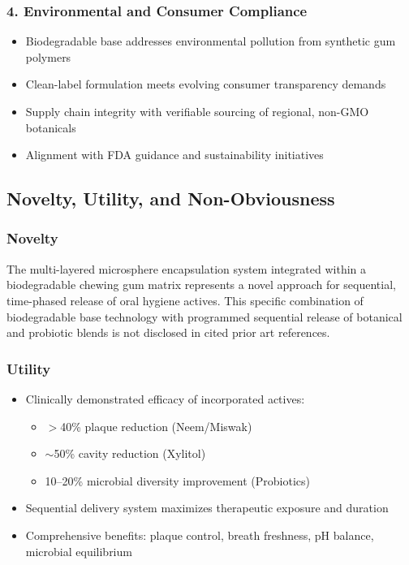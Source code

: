 \documentclass[12pt]{article}
\begin{document}
\subsubsection*{4. Environmental and Consumer Compliance}
\begin{itemize}
    \item Biodegradable base addresses environmental pollution from synthetic gum polymers
    \item Clean-label formulation meets evolving consumer transparency demands
    \item Supply chain integrity with verifiable sourcing of regional, non-GMO botanicals
    \item Alignment with FDA guidance and sustainability initiatives
\end{itemize}

\subsection*{Novelty, Utility, and Non-Obviousness}

\subsubsection*{Novelty}
The multi-layered microsphere encapsulation system integrated within a biodegradable chewing gum matrix represents a novel approach for sequential, time-phased release of oral hygiene actives. This specific combination of biodegradable base technology with programmed sequential release of botanical and probiotic blends is not disclosed in cited prior art references.

\subsubsection*{Utility}
\begin{itemize}
    \item Clinically demonstrated efficacy of incorporated actives:
        \begin{itemize}
            \item $>$40\% plaque reduction (Neem/Miswak)
            \item $\sim$50\% cavity reduction (Xylitol)
            \item 10--20\% microbial diversity improvement (Probiotics) 
        \end{itemize}
    \item Sequential delivery system maximizes therapeutic exposure and duration
    \item Comprehensive benefits: plaque control, breath freshness, pH balance, microbial equilibrium
\end{itemize}
\end{document}
